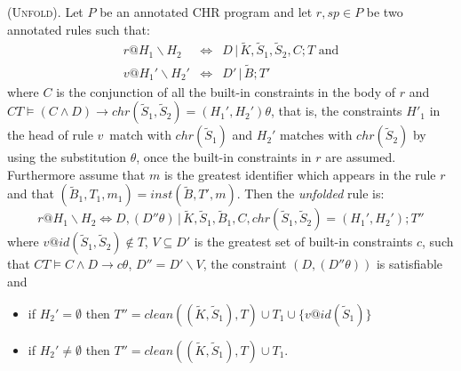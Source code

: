 \documentclass[final]{acmtrans2e}
\begin{document}
\begin{definition}\textsc{(Unfold).}\label{def:unf}
Let $P$ be an annotated CHR program  and let $r, sp\in P$ be two
annotated rules such that:
$$
\begin{array}{rcl}
r@H_1\backslash H_2 &\Leftrightarrow&  D\,|\,\tilde K, \tilde S_1, \tilde S_2, C; T \mbox{ and}\\
v@H_1'\backslash H_2' &\Leftrightarrow & D '\,|\, \tilde B;
T'
\end{array}
$$
where $C$ is the conjunction of all the built-in constraints in the body
of $r$ and $CT \models (C \wedge D) \rightarrow chr(\tilde S_1, \tilde S_2)= (H_1',
H_2')\theta$, that is, the constraints $H'_1$  in the head of rule
$v\, $ match with $chr(\tilde S_1)$ and $H_2'$ matches with $chr(\tilde
S_2)$ by using the substitution $\theta$,
once the built-in constraints in $r$ are assumed. Furthermore assume that
$m$ is the greatest identifier which appears in the
rule $r$ and that $(\tilde B_1, T_1, m_1)=inst(\tilde B, T',m)$.
Then the \emph{unfolded} rule is:
$$r@ H_1\backslash H_2
\Leftrightarrow D, (D''\theta)\, |\, \tilde K,\tilde S_1,\tilde
B_1,C, chr(\tilde S_1, \tilde S_2)= (H_1', H_2'); T''$$ where $v @id (\tilde
S_1, \tilde S_2) \not \in T$,  $V\subseteq
D'$ is the greatest set of built-in constraints $c$, such that $CT \models C\wedge D\rightarrow c\theta$,
$D''= D'\backslash V$, the
constraint $(D, (D''\theta))$ is satisfiable and
\begin{itemize}
    \item if $H_2'=\emptyset$ then $T''=clean((\tilde K,\tilde S_1) , T) \cup T_1 \cup\{v @id (\tilde
S_1)\}$
    \item if $H_2'\not =\emptyset$ then $T''=clean((\tilde K,\tilde S_1) , T) \cup T_1$.
    \end{itemize}
\end{definition}
\end{document}

